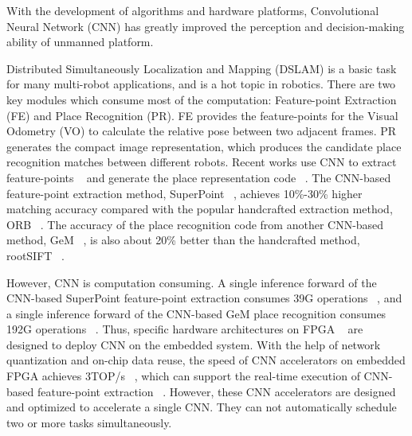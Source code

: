 With the development of algorithms and hardware platforms, Convolutional Neural Network (CNN) has greatly improved the perception and decision-making ability of unmanned platform. 

Distributed Simultaneously Localization and Mapping (DSLAM) is a basic task for many multi-robot applications, and is a hot topic in robotics. There are two key modules which consume most of the computation: Feature-point Extraction (FE) and Place Recognition (PR). 
FE provides the feature-points for the Visual Odometry (VO) to calculate the relative pose between two adjacent frames. PR generates the compact image representation, which produces the candidate place recognition matches between different robots. 
Recent works use CNN to extract feature-points  ~\cite{detone2018superpoint, simo2015discriminative, yi2016lift} and generate the place representation code  ~\cite{arandjelovic2016netvlad, radenovic2018fine}. 
The CNN-based feature-point extraction method, SuperPoint  ~\cite{detone2018superpoint}, achieves 10\%-30\% higher matching accuracy compared with the popular handcrafted extraction method, ORB ~\cite{Mur-Artal:2017281}.
The accuracy of the place recognition code from another CNN-based method, GeM  ~\cite{radenovic2018fine}, is also about 20\% better than the handcrafted method, rootSIFT  ~\cite{jegou2014triang}.

However, CNN is computation consuming. A single inference forward of the CNN-based SuperPoint feature-point extraction consumes 39G operations  ~\cite{detone2018superpoint}, and a single inference forward of the CNN-based GeM  place recognition consumes 192G operations  ~\cite{radenovic2018fine}.
Thus, specific hardware architectures on FPGA  ~\cite{guo2017angel,yu2018instruction,li_high_2016,qiu2016going,lu_evaluating_2017} are designed to deploy CNN on the embedded system.
With the help of network quantization and on-chip data reuse, the speed of CNN accelerators on embedded FPGA achieves 3TOP/s  ~\cite{lu_evaluating_2017}, which can support the real-time execution of CNN-based feature-point extraction  ~\cite{detone2018superpoint}.
However, these CNN accelerators are designed and optimized to accelerate a single CNN. They can not automatically schedule two or more tasks simultaneously. 


